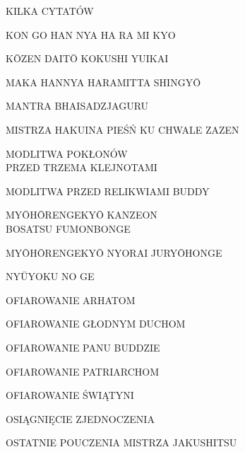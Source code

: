 \par\noindent KILKA CYTATÓW \dotfill \makebox[1.0cm][r]{\pageref{cytaty}}
\par\noindent KON GO HAN NYA HA RA MI KYO \dotfill \makebox[1.0cm][r]{\pageref{kon_go_han_nya_ha_ra_mi_kyo}}
\par\noindent K\=OZEN DAIT\=O KOKUSHI YUIKAI \dotfill \makebox[1.0cm][r]{\pageref{kozen_daito_kokushi_yuikai}}
\par\noindent MAKA HANNYA HARAMITTA SHINGY\=O \dotfill \makebox[1.0cm][r]{\pageref{hannya_shin_gyo}}
\par\noindent MANTRA BHAISADZJAGURU \dotfill \makebox[1.0cm][r]{\pageref{mantra_bhaisadzjaguru}}
\par\noindent MISTRZA HAKUINA PIEŚŃ KU CHWALE ZAZEN \dotfill \makebox[1.0cm][r]{\pageref{mistrza_hakuina_piesn}}
\par\noindent MODLITWA POKŁONÓW\\ PRZED TRZEMA KLEJNOTAMI \dotfill \makebox[1.0cm][r]{\pageref{trzy_skarby}}
\par\noindent MODLITWA PRZED RELIKWIAMI BUDDY \dotfill \makebox[1.0cm][r]{\pageref{przed_relikwiami}}
\par\noindent MY\=OH\=ORENGEKY\=O KANZEON\\ BOSATSU FUMONBONGE \dotfill \makebox[1.0cm][r]{\pageref{myohorengekyo_kanzeonbosatsu_fumonbonge}}
\par\noindent MY\=OH\=ORENGEKY\=O NYORAI JURY\=OHONGE \dotfill \makebox[1.0cm][r]{\pageref{myohorengekyo_nyorai_juryohonge}}
\par\noindent NY\=UYOKU NO GE \dotfill \makebox[1.0cm][r]{\pageref{nyuyoku_no_ge}}
\par\noindent OFIAROWANIE ARHATOM \dotfill \makebox[1.0cm][r]{\pageref{ofiarowanie_arhatom}}
\par\noindent OFIAROWANIE GŁODNYM DUCHOM \dotfill \makebox[1.0cm][r]{\pageref{ofiarowanie_glodnym_duchom}}
\par\noindent OFIAROWANIE PANU BUDDZIE \dotfill \makebox[1.0cm][r]{\pageref{ofiarowanie_panu_buddzie}}
\par\noindent OFIAROWANIE PATRIARCHOM \dotfill \makebox[1.0cm][r]{\pageref{ofiarowanie_patriarchom}}
\par\noindent OFIAROWANIE ŚWIĄTYNI \dotfill \makebox[1.0cm][r]{\pageref{ofiarowanie_swiatyni}}
\par\noindent OSIĄGNIĘCIE ZJEDNOCZENIA \dotfill \makebox[1.0cm][r]{\pageref{osiagniecie_zjednoczenia}}
\par\noindent OSTATNIE POUCZENIA MISTRZA JAKUSHITSU \dotfill \makebox[1.0cm][r]{\pageref{ostatnie_pouczenia_mistrza_jakushitsu}}
